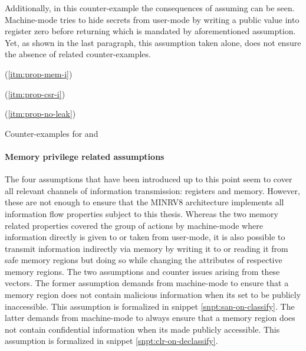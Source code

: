 Additionally, in this counter-example the consequences of assuming  can be seen.
Machine-mode tries to hide secrets from user-mode by writing a public value into register zero before returning which is mandated by aforementioned assumption.
Yet, as shown in the last paragraph, this assumption taken alone, does not ensure the absence of  related counter-examples.

\begin{table}
    \begin{subtable}{\textwidth}
        \centering
        
        \caption{ (\ref{itm:prop-mem-i})}
        \label{tbl:cex-mem-i-npw}
    \end{subtable}

    \begin{subtable}{\textwidth}
        \centering
        
        \caption{ (\ref{itm:prop-csr-i})}
        \label{tbl:cex-csr-i-npw}
    \end{subtable}

    \begin{subtable}{\textwidth}
        \centering
        
        \caption{ (\ref{itm:prop-no-leak})}
        \label{tbl:cex-no-leak-npw}
    \end{subtable}
    \caption{Counter-examples for  and }
\end{table}

\paragraph{Memory privilege related assumptions}
The four assumptions that have been introduced up to this point seem to cover all relevant channels of information transmission: registers and memory.
However, these are not enough to ensure that the MINRV8 architecture implements all information flow properties subject to this thesis.
Whereas the two memory related properties covered the group of actions by machine-mode where information directly is given to or taken from user-mode, it is also possible to transmit information indirectly via memory by writing it to or reading it from safe memory regions but doing so while changing the attributes of respective memory regions.
The two assumptions  and  counter issues arising from these vectors.
The former assumption demands from machine-mode to ensure that a memory region does not contain malicious information when its set to be publicly inaccessible.
This assumption is formalized in snippet \ref{snpt:san-on-classify}.
The latter demands from machine-mode to always ensure that a memory region does not contain confidential information when its made publicly accessible.
This assumption is formalized in snippet \ref{snpt:clr-on-declassify}.


